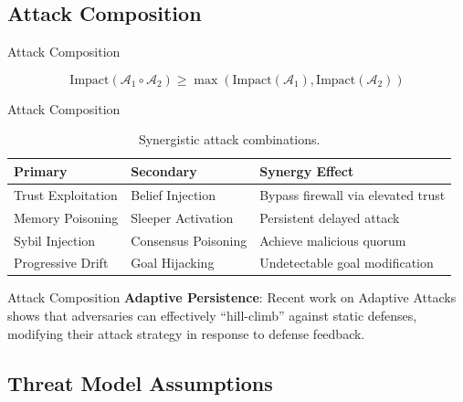 \documentclass[
  ignorenonframetext,
]{beamer}
\begin{document}
\subsection{Attack Composition}\label{attack-composition}

\begin{frame}[allowframebreaks]{Attack Composition}
\begin{definition}
\label{def:attack-composition}
\begin{equation}
\label{eq:attack-composition}
\text{Impact}(\mathcal{A}_1 \circ \mathcal{A}_2) \geq \max(\text{Impact}(\mathcal{A}_1), \text{Impact}(\mathcal{A}_2))
\end{equation}
\end{definition}

\end{frame}

\begin{frame}[allowframebreaks]{Attack Composition}
\begin{table}[htbp]
\centering
\caption{Synergistic attack combinations.}
\label{tab:attack-synergy}
\begin{tabular}{@{}llp{5cm}@{}}
\toprule
Primary & Secondary & Synergy Effect \\
\midrule
Trust Exploitation & Belief Injection & Bypass firewall via elevated trust \\
Memory Poisoning & Sleeper Activation & Persistent delayed attack \\
Sybil Injection & Consensus Poisoning & Achieve malicious quorum \\
Progressive Drift & Goal Hijacking & Undetectable goal modification \\
\bottomrule
\end{tabular}
\end{table}

\end{frame}

\begin{frame}[allowframebreaks]{Attack Composition}
\textbf{Adaptive Persistence}: Recent work on Adaptive Attacks
\cite{adaptive2025attacks} shows that adversaries can effectively
``hill-climb'' against static defenses, modifying their attack strategy
in response to defense feedback.
\end{frame}

\subsection{Threat Model Assumptions}\label{threat-model-assumptions}
\end{document}
